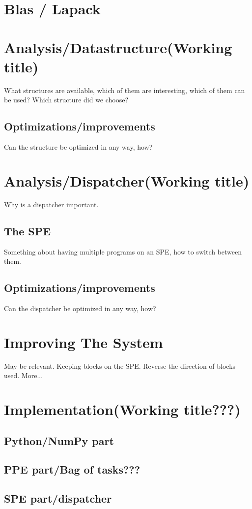 \documentclass[10pt,a4paper,onesided]{article}
\begin{document}
\section{Blas / Lapack}

\section{Analysis/Datastructure(Working title)}
What structures are available, which of them are interesting, which of
them can be used? Which structure did we choose?
\subsection{Optimizations/improvements}
Can the structure be optimized in any way, how?

\section{Analysis/Dispatcher(Working title)}
Why is a dispatcher important.
\subsection{The SPE}
Something about having multiple programs on an SPE, how to switch
between them.
\subsection{Optimizations/improvements}
Can the dispatcher be optimized in any way, how?

\section{Improving The System}
May be relevant. Keeping blocks on the SPE. Reverse the direction of
blocks used. More...

\section{Implementation(Working title???)}
\subsection{Python/NumPy part}
\subsection{PPE part/Bag of tasks???}
\subsection{SPE part/dispatcher}
\end{document}
